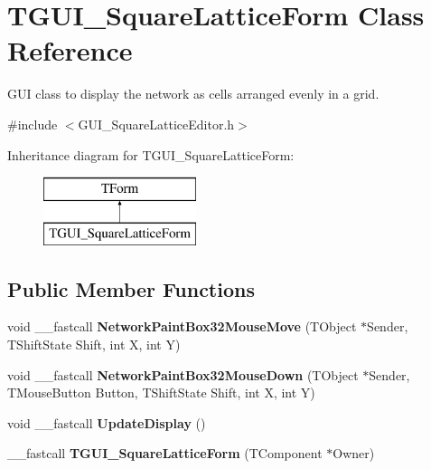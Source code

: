 \hypertarget{class_t_g_u_i___square_lattice_form}{\section{T\+G\+U\+I\+\_\+\+Square\+Lattice\+Form Class Reference}
\label{class_t_g_u_i___square_lattice_form}
}


G\+U\+I class to display the network as cells arranged evenly in a grid.  




{\ttfamily \#include $<$G\+U\+I\+\_\+\+Square\+Lattice\+Editor.\+h$>$}

Inheritance diagram for T\+G\+U\+I\+\_\+\+Square\+Lattice\+Form\+:\begin{figure}[H]
\begin{center}
\leavevmode
\includegraphics[height=2.000000cm]{class_t_g_u_i___square_lattice_form}
\end{center}
\end{figure}
\subsection*{Public Member Functions}
\begin{DoxyCompactItemize}
\item 
\hypertarget{class_t_g_u_i___square_lattice_form_a4ab9c02ead9e2242ab64920e2acfb0c2}{void \+\_\+\+\_\+fastcall {\bfseries Network\+Paint\+Box32\+Mouse\+Move} (T\+Object $\ast$Sender, T\+Shift\+State Shift, int X, int Y)}\label{class_t_g_u_i___square_lattice_form_a4ab9c02ead9e2242ab64920e2acfb0c2}

\item 
\hypertarget{class_t_g_u_i___square_lattice_form_a3149387afca4cae9338dc3b86b8e090c}{void \+\_\+\+\_\+fastcall {\bfseries Network\+Paint\+Box32\+Mouse\+Down} (T\+Object $\ast$Sender, T\+Mouse\+Button Button, T\+Shift\+State Shift, int X, int Y)}\label{class_t_g_u_i___square_lattice_form_a3149387afca4cae9338dc3b86b8e090c}

\item 
\hypertarget{class_t_g_u_i___square_lattice_form_a3cf1abdd638f931888542a45c7ab2f22}{void \+\_\+\+\_\+fastcall {\bfseries Update\+Display} ()}\label{class_t_g_u_i___square_lattice_form_a3cf1abdd638f931888542a45c7ab2f22}

\item 
\hypertarget{class_t_g_u_i___square_lattice_form_a09b4459eb21fb8c89d48eb0e404fe68d}{\+\_\+\+\_\+fastcall {\bfseries T\+G\+U\+I\+\_\+\+Square\+Lattice\+Form} (T\+Component $\ast$Owner)}\label{class_t_g_u_i___square_lattice_form_a09b4459eb21fb8c89d48eb0e404fe68d}

\end{DoxyCompactItemize}
